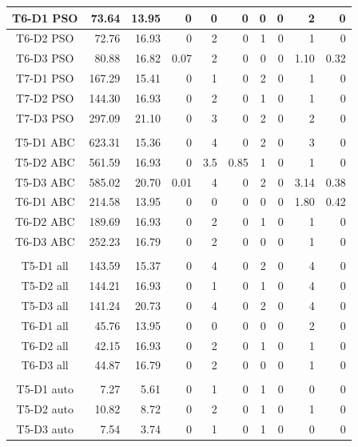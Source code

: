 \documentclass[a4paper,slovak,12pt,appendix]{article}
\begin{document}
\begin{appendices}
\begin{table}[!ht]
\begin{tabular}{|c|r|r|r|r|r|r|r|r|r|}
		T6-D1 PSO		&		73.64		&	13.95		&	0			&	0	&	0	&	0	&	0	&	2			&	0			\\ \hline
		T6-D2 PSO		&		72.76		&	16.93		&	0			&	2	&	0	&	1	&	0	&	1			&	0			\\ \hline
		T6-D3 PSO		&		80.88		&	16.82		&	0.07	&	2	&	0	&	0	&	0	&	1.10	&	0.32	\\ \hline

		T7-D1 PSO		&		167.29	&	15.41		&	0	&	1	&	0	&	2	&	0	&	1	&	0	\\ \hline
		T7-D2 PSO		&		144.30	&	16.93		&	0	&	2	&	0	&	1	&	0	&	1	&	0	\\ \hline
		T7-D3 PSO		&		297.09	&	21.10		&	0	&	3	&	0	&	2	&	0	&	2	&	0	\\ \hline
		\multicolumn{10}{|c|}{}	\\ \hline

		T5-D1 ABC		&		623.31	&	15.36		&	0			&	4		&	0			&	2	&	0	&	3			&	0			\\ \hline
		T5-D2 ABC		&		561.59	&	16.93		&	0			&	3.5	&	0.85	&	1	&	0	&	1			&	0			\\ \hline
		T5-D3 ABC		&		585.02	&	20.70		&	0.01	&	4		&	0			&	2	&	0	&	3.14	&	0.38	\\ \hline

		T6-D1 ABC		&		214.58	&	13.95		&	0	&	0	&	0	&	0	&	0	&	1.80	&	0.42	\\ \hline
		T6-D2 ABC		&		189.69	&	16.93		&	0	&	2	&	0	&	1	&	0	&	1			&	0	\\ \hline
		T6-D3 ABC		&		252.23	&	16.79		&	0	&	2	&	0	&	0	&	0	&	1			&	0	\\ \hline
		\multicolumn{10}{|c|}{}	\\ \hline

		T5-D1 all		&		143.59	&	15.37		&	0	&	4	&	0	&	2	&	0	&	4	&	0	\\ \hline
		T5-D2 all		&		144.21	&	16.93		&	0	&	1	&	0	&	1	&	0	&	4	&	0	\\ \hline
		T5-D3 all		&		141.24	&	20.73		&	0	&	4	&	0	&	2	&	0	&	4	&	0	\\ \hline

		T6-D1 all		&		45.76		&	13.95		&	0	&	0	&	0	&	0	&	0	&	2	&	0	\\ \hline
		T6-D2 all		&		42.15		&	16.93		&	0	&	2	&	0	&	1	&	0	&	1	&	0	\\ \hline
		T6-D3 all		&		44.87		&	16.79		&	0	&	2	&	0	&	0	&	0	&	1	&	0	\\ \hline
		\multicolumn{10}{|c|}{}	\\ \hline

		T5-D1 auto	&		7.27		&	5.61		&	0	&	1	&	0	&	1	&	0	&	0			&	0	\\ \hline
		T5-D2 auto	&		10.82		&	8.72		&	0	&	2	&	0	&	1	&	0	&	1			&	0	\\ \hline
		T5-D3 auto	&		7.54		&	3.74		&	0	&	1	&	0	&	1	&	0	&	0			&	0	\\ \hline


\end{tabular}
\end{table}
\end{appendices}
\end{document}
